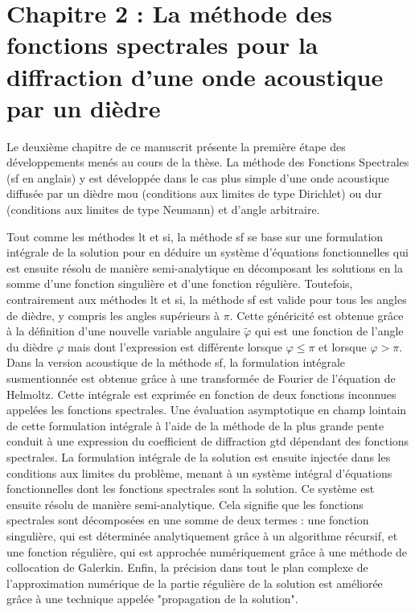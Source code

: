 \section[Résumé du chapitre 2]{Chapitre 2 : La méthode des fonctions spectrales pour la diffraction d'une onde acoustique par un dièdre}

\hspace{2em}Le deuxième chapitre de ce manuscrit présente la première étape des développements menés au cours de la thèse. La méthode des Fonctions Spectrales (\acrshort{sf} en anglais) y est développée dans le cas plus simple d'une onde acoustique diffusée par un dièdre mou (conditions aux limites de type Dirichlet) ou dur (conditions aux limites de type Neumann) et d'angle arbitraire.

Tout comme les méthodes \acrshort{lt} et \acrshort{si}, la méthode \acrshort{sf} se base sur une formulation intégrale de la solution pour en déduire un système d'équations fonctionnelles qui est ensuite résolu de manière semi-analytique en décomposant les solutions en la somme d'une fonction singulière et d'une fonction régulière. Toutefois, contrairement aux méthodes \acrshort{lt} et \acrshort{si}, la méthode \acrshort{sf} est valide pour tous les angles de dièdre, y compris les angles supérieurs à $\pi$. Cette généricité est obtenue grâce à la définition d'une nouvelle variable angulaire $\tilde{\varphi}$ qui est une fonction de l'angle du dièdre $\varphi$ mais dont l'expression est différente lorsque $\varphi \leq \pi$ et lorsque $\varphi>\pi$. Dans la version acoustique de la méthode \acrshort{sf}, la formulation intégrale susmentionnée est obtenue grâce à une transformée de Fourier de l'équation de Helmoltz. Cette intégrale est exprimée en fonction de deux fonctions inconnues appelées les fonctions spectrales. Une évaluation asymptotique en champ lointain de cette formulation intégrale à l'aide de la méthode de la plus grande pente conduit à une expression du coefficient de diffraction \acrshort{gtd} dépendant des fonctions spectrales. La formulation intégrale de la solution est ensuite injectée dans les conditions aux limites du problème, menant à un système intégral d'équations fonctionnelles dont les fonctions spectrales sont la solution. Ce système est ensuite résolu de manière semi-analytique. Cela signifie que les fonctions spectrales sont décomposées en une somme de deux termes : une fonction singulière, qui est déterminée analytiquement grâce à un algorithme récursif, et une fonction régulière, qui est approchée numériquement grâce à une méthode de collocation de Galerkin. Enfin, la précision dans tout le plan complexe de l'approximation numérique de la partie régulière de la solution est améliorée grâce à une technique appelée "propagation de la solution".


